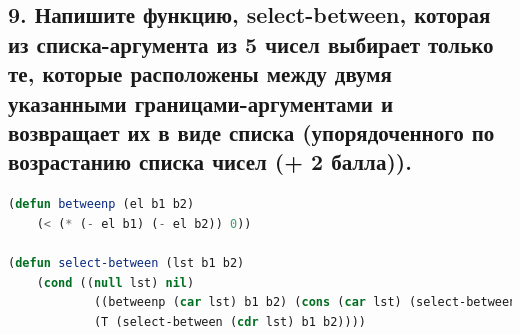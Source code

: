 \documentclass[12pt]{report}
\begin{document}
\newpage
\subsection*{9. Напишите функцию, select-between, которая из списка-аргумента из 5 чисел выбирает
	только те, которые расположены между двумя указанными границами-аргументами и
	возвращает их в виде списка (упорядоченного по возрастанию списка чисел (+ 2 балла)).}

\begin{lstlisting}[label=6xd, caption=Решение задания №9, language=lisp]
(defun betweenp (el b1 b2)
	(< (* (- el b1) (- el b2)) 0))

(defun select-between (lst b1 b2)
	(cond ((null lst) nil)
			((betweenp (car lst) b1 b2) (cons (car lst) (select-between (cdr lst) b1 b2)))
			(T (select-between (cdr lst) b1 b2))))

\end{lstlisting}
\end{document}
